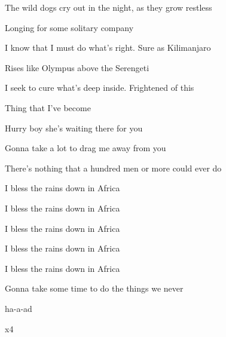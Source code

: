 \begin{song}
\bigskip

 The wild dogs cry out in the night, as they grow restless \par
{}Longing for some solitary company  \par
{} I know that I must do what's right. Sure as Kilimanjaro \par
{}Rises like Olympus above the Serengeti  \par
{} I seek to cure what's deep inside. Frightened of this \par
{}Thing that I've become  \par

\bigskip

\Chorus \par

\bigskip

         \par
{}   Hurry boy she's waiting there for you  \par

\bigskip

 Gonna take a lot to drag me away from you \par
{} There's nothing that a hundred men or more could ever do \par
{} I bless the rains down in Africa \par
{} I bless the rains down in Africa  \par
{} I bless the rains down in Africa  \par
{} I bless the rains down in Africa \par
{} I bless the rains down in Africa  \par
{} Gonna take some time to do the things we never \par
{}ha-a-ad \par

\bigskip

\Outro {}   x4 \par

\end{song}